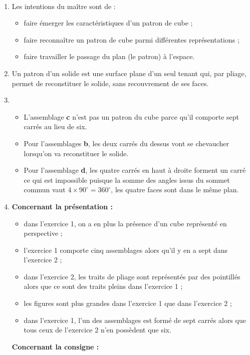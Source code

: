 \ \\ [-5mm]
\begin{enumerate}
   \item Les intentions du maître sont de :
   \begin{itemize}
      \item faire émerger les caractéristiques d'un patron de cube ;
      \item faire reconnaître un patron de cube parmi différentes représentations ;
      \item faire travailler le passage du plan (le patron) à l'espace.
   \end{itemize}
   \item Un \og patron \fg{} d'un solide est une surface plane d'un seul tenant qui, par pliage, permet de reconstituer le solide, sans recouvrement de ses faces.
   \item
   \begin{itemize}
      \item L'assemblage {\bf c} n'est pas un patron du cube parce qu'il comporte sept carrés au lieu de six.
      \item Pour l'assemblages {\bf b}, les deux carrés \og du dessus \fg{} vont se chevaucher lorsqu'on va reconstituer le solide.
      \item Pour l'assemblage {\bf d}, les quatre carrés en haut à droite forment un carré ce qui est impossible puisque la somme des angles issus du sommet commun vaut $4\times90^\circ = 360^\circ$, les quatre faces sont dans le même plan.
   \end{itemize}
   \item {\bf Concernant la présentation :}
   \begin{itemize}
      \item dans l'exercice 1, on a en plus la présence d'un cube représenté en perspective ;
      \item l'exercice 1 comporte cinq assemblages alors qu'il y en a sept dans l'exercice 2 ;
      \item dans l'exercice 2, les \og traits de pliage \fg{} sont représentés par des pointillés alors que ce sont des traits pleins dans l'exercice 1 ;
      \item les figures sont plus grandes dans l'exercice 1 que dans l'exercice 2 ;
      \item dans l'exercice 1, l'un des assemblages est formé de sept carrés alors que tous ceux de l'exercice 2 n'en possèdent que six.
   \end{itemize}
   {\bf Concernant la consigne :}

\end{enumerate}

